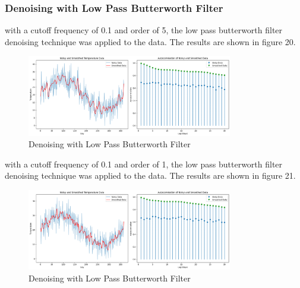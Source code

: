 \documentclass[a4paper,12pt]{article} %
\begin{document}
\subsubsection{ Denoising with Low Pass Butterworth Filter}
with a cutoff frequency of 0.1 and order of 5, the low pass butterworth filter denoising technique was applied to the data. The results are shown in figure 20.
\begin{figure}[h]
\centering
\includegraphics[width=0.8\textwidth]{Q2_LPB_0.1_5.png}
\caption{Denoising with Low Pass Butterworth Filter}
\end{figure}
\clearpage
with a cutoff frequency of 0.1 and order of 1, the low pass butterworth filter denoising technique was applied to the data. The results are shown in figure 21.
\begin{figure}[h]
\centering
\includegraphics[width=0.8\textwidth]{Q2_LPB_0.1_2.png}
\caption{Denoising with Low Pass Butterworth Filter}
\end{figure}
\clearpage
\end{document}
